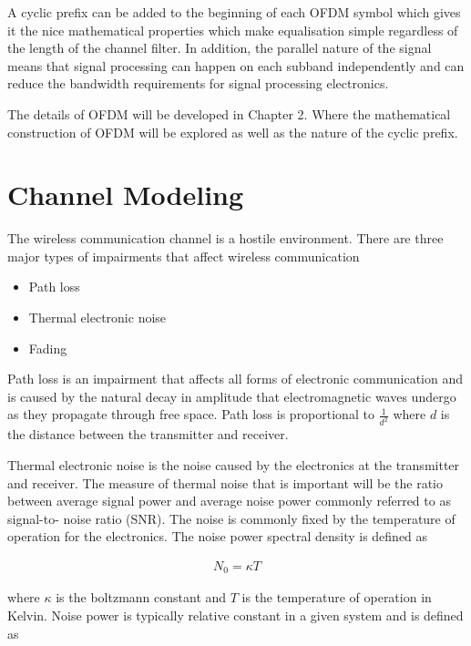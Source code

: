 
A cyclic prefix can be added to the beginning of each OFDM %
symbol which gives it the nice mathematical properties %
which make equalisation simple regardless of the length %
of the channel filter. In addition, the parallel nature %
of the signal means that signal processing can happen %
on each subband independently and can reduce the bandwidth %
requirements for signal processing electronics.

The details of OFDM will be developed in Chapter 2. 
Where the mathematical construction of OFDM will be
explored as well as the nature of the cyclic prefix.

\section{Channel Modeling}

The wireless communication channel is a %
hostile environment. There are three %
major types of impairments that affect %
wireless communication

\begin{itemize}
	\item{Path loss}
	\item{Thermal electronic noise}
	\item{Fading}
\end{itemize}

Path loss is an impairment that affects %
all forms of electronic communication and is %
caused by the natural decay in amplitude %
that electromagnetic waves undergo as they %
propagate through free space. Path loss %
is proportional to $\frac{1}{d^2}$ where %
$d$ is the distance between the transmitter %
and receiver.

Thermal electronic noise is the noise %
caused by the electronics at the %
transmitter and receiver. The measure %
of thermal noise that is important %
will be the ratio between average %
signal power and average noise power %
commonly referred to as signal-to-%
noise ratio (SNR). The noise is %
commonly fixed by the temperature %
of operation for the electronics. %
The noise power spectral density %
is defined as %

\begin{align}
	N_{0} = \kappa T
\end{align}

where $\kappa$ is the boltzmann %
constant and $T$ is the temperature %
of operation in Kelvin. Noise %
power is typically relative constant %
in a given system and is defined as

